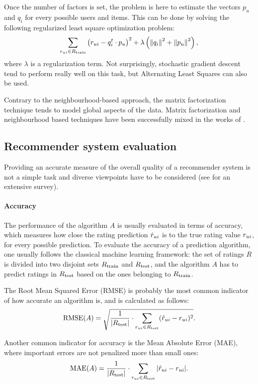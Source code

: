 Once the number of factors is set, the problem is here to estimate the vectors
$p_u$ and $q_i$ for every possible users and items. This can be done by solving
the following regularized least square optimization problem:
$$
\sum_{r_{ui} \in R_{\text{train}}} \left(r_{ui} - q_i^t \cdot p_u \right)^2 +
\lambda\left({\left\lVert q_i\right\rVert}_{}^2 + {\left\lVert p_u\right\rVert}_{}^2\right),
$$
where $\lambda$ is a regularization term. Not surprisingly, stochastic gradient
descent tend to perform really well on this task, but Alternating Least Squares
can also be used.


Contrary to the neighbourhood-based approach, the matrix factorization
technique tends to model global aspects of the data.  Matrix factorization and
neighbourhood based techniques have been successfully mixed in the works of
\cite{KorACM2010}.

\subsection{Recommender system
evaluation}\label{eval} Providing an accurate measure of the overall quality of
a recommender system is not a simple task and diverse viewpoints have to be
considered (see \cite{RecoSystemHandbook} for an extensive survey).

\paragraph{Accuracy\\}
The performance of the algorithm $A$ is usually evaluated in terms of accuracy,
which measures how close the rating prediction $\hat{r}_{ui}$ is to the true
rating value $r_{ui}$, for every possible prediction. To evaluate the accuracy
of a prediction algorithm, one usually follows the classical machine learning
framework: the set of ratings $R$ is divided into two disjoint sets $R_{\text{train}}$
and $R_{\text{test}}$, and the algorithm $A$ has to predict ratings in $R_{\text{test}}$
based on the ones belonging to $R_{\text{train}}$.

The Root Mean Squared Error (RMSE) is probably the most common indicator of
how accurate an algorithm is, and is calculated as follows:
$$\text{RMSE}(A) = \sqrt{\frac{1}{|R_{\text{test}}|} \cdot \sum_{r_{ui} \in
R_{\text{test}}}(\hat{r}_{ui} - r_{ui})^2}.$$

Another common indicator for accuracy is the Mean Absolute Error (MAE), where
important errors are not penalized more than small ones:
$$\text{MAE}(A) = \frac{1}{|R_{\text{test}}|} \cdot \sum_{r_{ui} \in R_{\text{test}}}|\hat{r}_{ui} -
r_{ui}|.$$

